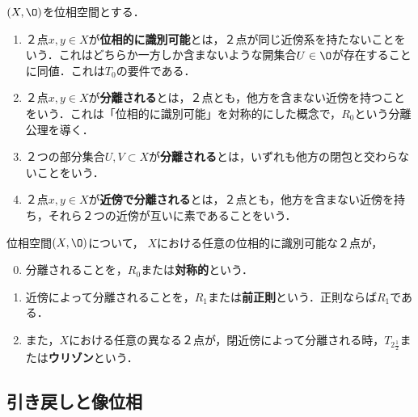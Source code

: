 \documentclass[uplatex,dvipdfmx]{jsreport}
\begin{document}
\begin{definition}
    $(X,\O)$を位相空間とする．
    \begin{enumerate}
        \item ２点$x,y\in X$が\textbf{位相的に識別可能}とは，２点が同じ近傍系を持たないことをいう．これはどちらか一方しか含まないような開集合$U\in\O$が存在することに同値．これは$T_0$の要件である．
        \item ２点$x,y\in X$が\textbf{分離される}とは，２点とも，他方を含まない近傍を持つことをいう．これは「位相的に識別可能」を対称的にした概念で，$R_0$という分離公理を導く．
        \item ２つの部分集合$U,V\subset X$が\textbf{分離される}とは，いずれも他方の閉包と交わらないことをいう．
        \item ２点$x,y\in X$が\textbf{近傍で分離される}とは，２点とも，他方を含まない近傍を持ち，それら２つの近傍が互いに素であることをいう．
    \end{enumerate}
\end{definition}

\begin{definition}位相空間$(X,\O)$について，
    $X$における任意の位相的に識別可能な２点が，
    \begin{enumerate}\setcounter{enumi}{-1}
        \item 分離されることを，$R_0$または\textbf{対称的}という．
        \item 近傍によって分離されることを，$R_1$または\textbf{前正則}という．正則ならば$R_1$である．
        \item また，$X$における任意の異なる２点が，閉近傍によって分離される時，$T_{2\frac{1}{2}}$または\textbf{ウリゾン}という．
    \end{enumerate}
\end{definition}

\subsection{引き戻しと像位相}
\end{document}
